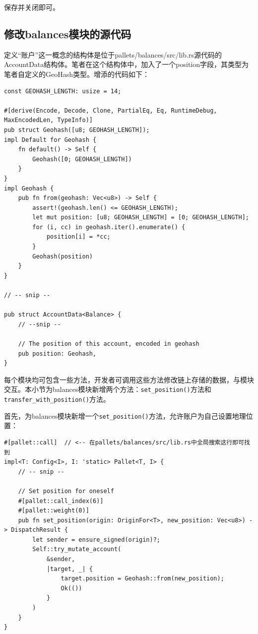保存并关闭即可。

\subsection{修改balances模块的源代码}

定义“账户”这一概念的结构体是位于pallets/balances/src/lib.rs源代码的AccountData结构体。笔者在这个结构体中，加入了一个position字段，其类型为笔者自定义的GeoHash类型。增添的代码如下：

\begin{lstlisting}[caption={为balances模块新增代码}]
const GEOHASH_LENGTH: usize = 14;

#[derive(Encode, Decode, Clone, PartialEq, Eq, RuntimeDebug, MaxEncodedLen, TypeInfo)]
pub struct Geohash([u8; GEOHASH_LENGTH]);
impl Default for Geohash {
	fn default() -> Self {
		Geohash([0; GEOHASH_LENGTH])
	}
}
impl Geohash {
	pub fn from(geohash: Vec<u8>) -> Self {
		assert!(geohash.len() <= GEOHASH_LENGTH);
		let mut position: [u8; GEOHASH_LENGTH] = [0; GEOHASH_LENGTH];
		for (i, cc) in geohash.iter().enumerate() {
			position[i] = *cc;
		}
		Geohash(position)
	}
}

// -- snip --

pub struct AccountData<Balance> {
    // --snip --

	// The position of this account, encoded in geohash
	pub position: Geohash,
}
\end{lstlisting}

每个模块均可包含一些方法，开发者可调用这些方法修改链上存储的数据，与模块交互。本小节为balances模块新增两个方法：\verb|set_position()|方法和\verb|transfer_with_position()|方法。

首先，为balances模块新增一个\verb|set_position()|方法，允许账户为自己设置地理位置：

\begin{lstlisting}
#[pallet::call]  // <-- 在pallets/balances/src/lib.rs中全局搜索这行即可找到
impl<T: Config<I>, I: 'static> Pallet<T, I> {
    // -- snip --

    // Set position for oneself
    #[pallet::call_index(6)]
    #[pallet::weight(0)]
    pub fn set_position(origin: OriginFor<T>, new_position: Vec<u8>) -> DispatchResult {
        let sender = ensure_signed(origin)?;
        Self::try_mutate_account(
            &sender,
            |target, _| {
                target.position = Geohash::from(new_position);
                Ok(())
            }
        )
    }
}
\end{lstlisting}

